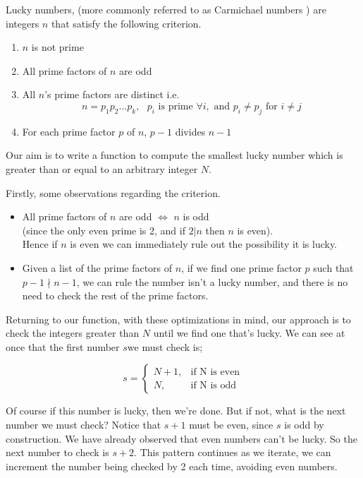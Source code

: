 \documentclass[10pt]{report}
\begin{document}
Lucky numbers, (more commonly referred to as Carmichael numbers \cite{carmichael}) are integers $n$ that satisfy the following criterion.

\begin{enumerate}
\item $n$ is not prime
\item All prime factors of $n$ are odd
\item All $n$'s prime factors are distinct i.e. 
$$n=p_1p_2...p_k,\text{     }  p_i \text{ is prime } \forall i, \text{ and } p_i \neq p_j \text{ for } i \neq j$$
\item For each prime factor $p$ of $n$, $p - 1$ divides $n-1$ 
\end{enumerate}

Our aim is to write a function to compute the smallest lucky number which is greater than or equal to an arbitrary integer $N$. 

Firstly, some observations regarding the criterion.

\begin{itemize}

\item All prime factors of $n$ are odd $\iff$ $n$ is odd\\
 (since the only even prime is 2, and if $2|n$ then $n$ is even).\\
 
 Hence if $n$ is even we can immediately rule out the possibility it is lucky.
\item Given a list of the prime factors of $n$, if we find one prime factor $p$ such that $p -1 \nmid n-1$, we can rule the number isn't a lucky number, and there is no need to check the rest of the prime factors.
\end{itemize}

Returning to our function, with these optimizations in mind,  our approach is to check the integers greater than $N$ until we find one that's lucky. We can see at once that the first number $s$we must check is;

$$ s = \begin{cases}
               N + 1,& \text{if N is even}\\
               N, & \text{if N is odd}
            \end{cases}
$$

Of course if this number is lucky, then we're done. But if not, what is the next number we must check? Notice that $s + 1$ must be even, since $s$ is odd by construction. We have already observed that even numbers can't be lucky. So the next number to check is $s+2$. This pattern continues as we iterate, we can increment the number being checked by 2 each time, avoiding even numbers.
\end{document}
